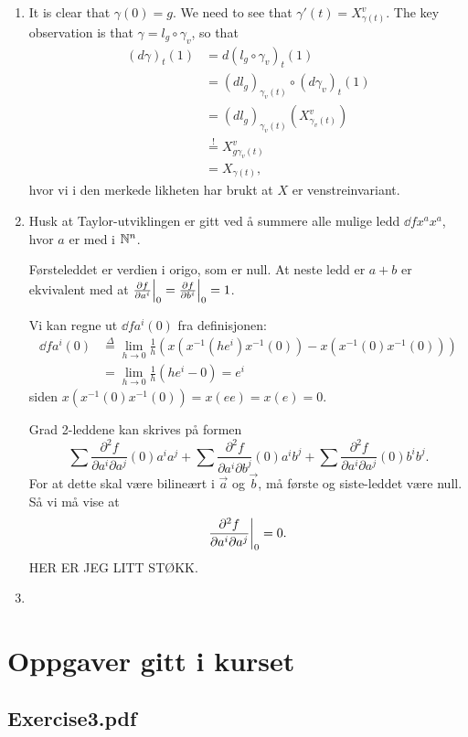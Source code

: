\documentclass[11pt, english]{article}
\begin{document}
\begin{sol}
  \begin{enumerate}
  \item It is clear that $\gamma(0)=g$. We need to see that $\gamma'(t)=X_{\gamma(t)}^v$. The key observation is that $\gamma = l_g \circ \gamma_v$, so that
\begin{align*}
(d\gamma)_t(1) &= d(l_g \circ \gamma_v)_t(1) \\
&= (d l_g)_{\gamma_v(t)} \circ (d \gamma_v)_t(1) \\
&= (d l_g)_{\gamma_v(t)}(X^v_{\gamma_v(t)}) \\
&\stackrel{!}{=} X^v_{g \gamma_v(t)} \\
&= X_{\gamma(t)},
\end{align*}
hvor vi i den merkede likheten har brukt at $X$ er venstreinvariant.

 \item Husk at Taylor-utviklingen er gitt ved å summere alle mulige ledd $\dd{f}{x^{a}} x^{a}$, hvor $a$ er med i $\mathbb{N}^n$. 

Førsteleddet er verdien i origo, som er null. At neste ledd er $a+b$ er ekvivalent med at $\restr{\dd{f}{a^i}}{0} = \restr{\dd{f}{b^i}}{0}= 1$. 

Vi kan regne ut $\dd{f}{a^i}(0)$ fra definisjonen:
\begin{align*}
\dd{f}{a^i}(0) &\stackrel{\Delta}{=} \lim_{h \to 0} \frac 1h \left( x(x^{-1}(he^i)x^{-1}(0))-x(x^{-1}(0)x^{-1}(0)) \right) \\
&=  \lim_{h \to 0} \frac 1h  (he^i-0) = e^i
\end{align*}
siden $x(x^{-1}(0)x^{-1}(0))=x(ee)=x(e)=0$.

Grad 2-leddene kan skrives på formen
\[
\sum \frac{\partial^2 f}{\partial a^i \partial a^j}(0) a^i a^j + 
\sum \frac{\partial^2 f}{\partial a^i \partial b^j}(0) a^i b^j +
\sum \frac{\partial^2 f}{\partial a^i \partial a^j}(0) b^i b^j.
\]
For at dette skal være bilineært i $\vec a$ og $\vec b$, må første og siste-leddet være null. Så vi må vise at 
$$
\restr{\frac{\partial^2 f}{\partial a^i \partial a^j}}{0}= 0.
$$
HER ER JEG LITT STØKK. 
\item 
  \end{enumerate}
\end{sol}

\section{Oppgaver gitt i kurset}
\subsection{Exercise3.pdf}
\end{document}
